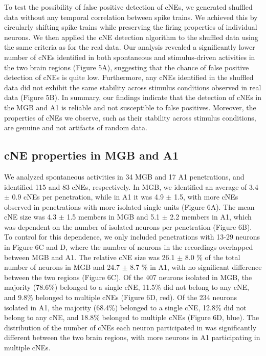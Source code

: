 \documentclass[11pt]{article}
\begin{document}
To test the possibility of false positive detection of cNEs, we generated shuffled data without any temporal correlation between spike trains. We achieved this by circularly shifting spike trains while preserving the firing properties of individual neurons. We then applied the cNE detection algorithm to the shuffled data using the same criteria as for the real data. Our analysis revealed a significantly lower number of cNEs identified in both spontaneous and stimulus-driven activities in the two brain regions (Figure 5A), suggesting that the chance of false positive detection of cNEs is quite low. Furthermore, any cNEs identified in the shuffled data did not exhibit the same stability across stimulus conditions observed in real data (Figure 5B). In summary, our findings indicate that the detection of cNEs in the MGB and A1 is reliable and not susceptible to false positives. Moreover, the properties of cNEs we observe, such as their stability across stimulus conditions, are genuine and not artifacts of random data.

\subsection*{cNE properties in MGB and A1}
We analyzed spontaneous activities in 34 MGB and 17 A1 penetrations, and identified 115 and 83 cNEs, respectively. In MGB, we identified an average of 3.4 $\pm$ 0.9 cNEs per penetration, while in A1 it was 4.9 $\pm$ 1.5, with more cNEs observed in penetrations with more isolated single units (Figure 6A). The mean cNE size was 4.3 $\pm$ 1.5 members in MGB and 5.1 $\pm$ 2.2 members in A1, which was dependent on the number of isolated neurons per penetration (Figure 6B). To control for this dependence, we only included penetrations with 13-29 neurons in Figure 6C and D, where the number of neurons in the recordings overlapped between MGB and A1. The relative cNE size was 26.1 $\pm$ 8.0 \% of the total number of neurons in MGB and 24.7 $\pm$ 8.7 \% in A1, with no significant difference between the two regions (Figure 6C). Of the 407 neurons isolated in MGB, the majority (78.6\%) belonged to a single cNE, 11.5\% did not belong to any cNE, and 9.8\% belonged to multiple cNEs (Figure 6D, red). Of the 234 neurons isolated in A1, the majority (68.4\%) belonged to a single cNE, 12.8\% did not belong to any cNE, and 18.8\% belonged to multiple cNEs (Figure 6D, blue). The distribution of the number of cNEs each neuron participated in was significantly different between the two brain regions, with more neurons in A1 participating in multiple cNEs. 
\end{document}
